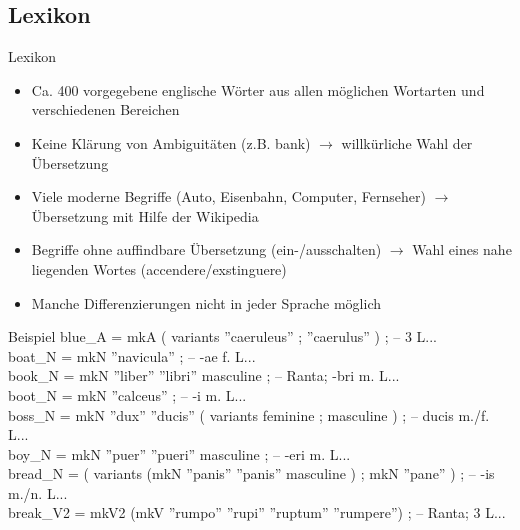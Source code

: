 \documentclass{beamer}
\begin{document}
\subsection{Lexikon}
\begin{frame}{Lexikon}
\begin{itemize}
  \item Ca. 400 vorgegebene englische Wörter aus allen möglichen Wortarten und verschiedenen Bereichen
  \item Keine Klärung von Ambiguitäten (z.B. bank) $\rightarrow$ willkürliche Wahl der Übersetzung
  \item Viele moderne Begriffe (Auto, Eisenbahn, Computer, Fernseher) $\rightarrow$ Übersetzung mit Hilfe der Wikipedia
  \item Begriffe ohne auffindbare Übersetzung (ein-/ausschalten) $\rightarrow$ Wahl eines nahe liegenden Wortes (accendere/exstinguere)
  \item Manche Differenzierungen nicht in jeder Sprache möglich
\end{itemize}
\end{frame}
\begin{frame}{}
\begin{block}{Beispiel}
{\scriptsize\ttfamily
  blue\_A = mkA ( variants { ''caeruleus'' ; ''caerulus'' } ) ; -- 3 L... \\
  boat\_N = mkN ''navicula'' ; -- -ae f. L... \\
  book\_N = mkN ''liber'' ''libri'' masculine ; -- Ranta; -bri m. L... \\
  boot\_N = mkN ''calceus'' ; -- -i m. L... \\
  boss\_N = mkN ''dux'' ''ducis'' ( variants { feminine ; masculine } ) ; -- ducis m./f. L... \\
  boy\_N = mkN ''puer'' ''pueri'' masculine ; -- -eri m. L... \\
  bread\_N = ( variants { (mkN ''panis'' ''panis'' masculine ) ; mkN ''pane'' } ) ; -- -is m./n. L...  \\
  break\_V2 = mkV2 (mkV ''rumpo'' ''rupi'' ''ruptum'' ''rumpere'') ; -- Ranta; 3 L...
}
\end{block}
\end{frame}
\end{document}
